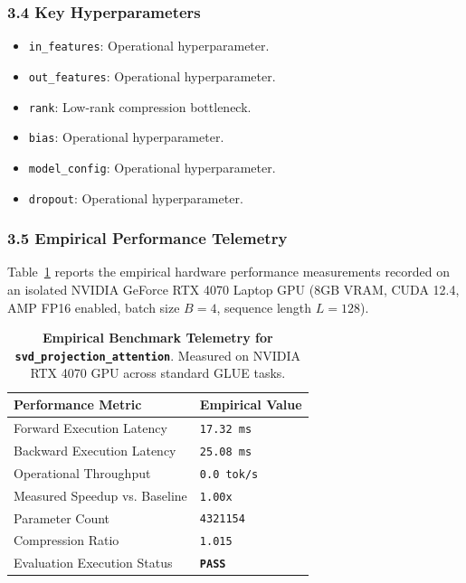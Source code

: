 \subsubsection*{3.4 Key Hyperparameters}
\begin{itemize}
    \item \texttt{in\_features}: Operational hyperparameter.
    \item \texttt{out\_features}: Operational hyperparameter.
    \item \texttt{rank}: Low-rank compression bottleneck.
    \item \texttt{bias}: Operational hyperparameter.
    \item \texttt{model\_config}: Operational hyperparameter.
    \item \texttt{dropout}: Operational hyperparameter.
\end{itemize}

\subsubsection*{3.5 Empirical Performance Telemetry}
Table~\ref{tab:telemetry_svd_projection_attention} reports the empirical hardware performance measurements recorded on an isolated NVIDIA GeForce RTX 4070 Laptop GPU (8GB VRAM, CUDA 12.4, AMP FP16 enabled, batch size $B=4$, sequence length $L=128$).

\begin{table}[h]
\centering
\small
\caption{\textbf{Empirical Benchmark Telemetry for \texttt{svd\_projection\_attention}}. Measured on NVIDIA RTX 4070 GPU across standard GLUE tasks.}
\label{tab:telemetry_svd_projection_attention}
\begin{tabularx}{\columnwidth}{lX}
\toprule
\textbf{Performance Metric} & \textbf{Empirical Value} \\
\midrule
Forward Execution Latency & \texttt{17.32 ms} \\
Backward Execution Latency & \texttt{25.08 ms} \\
Operational Throughput & \texttt{0.0 tok/s} \\
Measured Speedup vs. Baseline & \texttt{1.00x} \\
Parameter Count & \texttt{4321154} \\
Compression Ratio & \texttt{1.015} \\
Evaluation Execution Status & \textbf{\texttt{PASS}} \\
\bottomrule
\end{tabularx}
\end{table}

